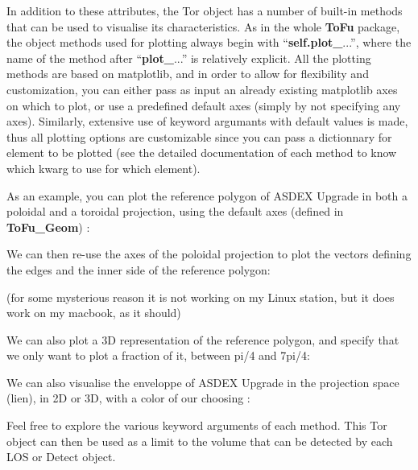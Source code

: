 \documentclass[letterpaper,10pt,english]{sphinxmanual}
\begin{document}
In addition to these attributes, the Tor object has a number of built-in methods that can be used to visualise its characteristics. As in the whole \textbf{ToFu} package, the object methods used for plotting always begin with ``{\color{red}\bfseries{}self.plot\_}...'', where the name of the method after ``{\color{red}\bfseries{}plot\_}...'' is relatively explicit. All the plotting methods are based on matplotlib, and in order to allow for flexibility and customization, you can either pass as input an already existing matplotlib axes on which to plot, or use a predefined default axes (simply by not specifying any axes). Similarly, extensive use of keyword argumants with default values is made, thus all plotting options are customizable since you can pass a dictionnary for element to be plotted (see the detailed documentation of each method to know which kwarg to use for which element).

As an example, you can plot the reference polygon of ASDEX Upgrade in both a poloidal and a toroidal projection, using the default axes (defined in \textbf{ToFu\_Geom}) :

We can then re-use the axes of the poloidal projection to plot the vectors defining the edges and the inner side of the reference polygon:

(for some mysterious reason it is not working on my Linux station, but it does work on my macbook, as it should)

We can also plot a 3D representation of the reference polygon, and specify that we only want to plot a fraction of it, between pi/4 and 7pi/4:

We can also visualise the enveloppe of ASDEX Upgrade in the projection space (lien), in 2D or 3D, with a color of our choosing :

Feel free to explore the various keyword arguments of each method.
This Tor object can then be used as a limit to the volume that can be detected by each LOS or Detect object.
\end{document}
